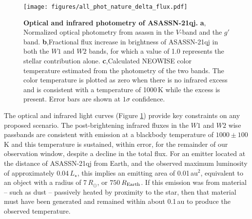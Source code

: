 \documentclass[sn-nature,oneside]{sn-jnl}%
\begin{document}
\begin{figure}
\begin{centering}
\texttt{[image: figures/all\_phot\_nature\_delta\_flux.pdf]}
\caption{\textbf{Optical and infrared photometry of ASASSN-21qj.}
%
{\bf a}, Normalized optical photometry from \gls{asassn} in the $V$-band and the $g'$ band.
%
{\bf b},Fractional flux increase in brightness of ASASSN-21qj in both the $W1$ and $W2$ bands, for which a value of 1.0 represents the stellar contribution alone.
%
{\bf c},Calculated NEOWISE color temperature estimated from the photometry of the two bands.
%
The color temperature is plotted as zero when there is no infrared excess and is consistent with a temperature of 1000\,K while the excess is present.
%
Error bars are shown at $1\sigma$ confidence.
}
\label{fig:wisephot}
\end{centering}
\end{figure}





The optical and infrared light curves (Figure \ref{fig:wisephot}) provide key constraints on any proposed scenario.
%
The post-brightening infrared fluxes in the $W1$ and $W2$ \gls{wise} passbands are consistent with emission at a blackbody temperature of $1000 \pm 100$\,K and this temperature is sustained, within error, for the remainder of our observation window, despite a decline in the total flux.
%
For an emitter located at the distance of ASASSN-21qj from Earth, and the observed  maximum luminosity of approximately 0.04\,$L_\star$, this implies an emitting area of 0.01\,au$^2$, equivalent to an object with a radius of 7\,$R_\odot$, or $750$\,$R_{\rm Earth}$.
%
If this emission was from material -- such as dust -- passively heated by proximity to the star, then that material must have been generated and remained within about 0.1\,au to produce the observed temperature.
\end{document}
